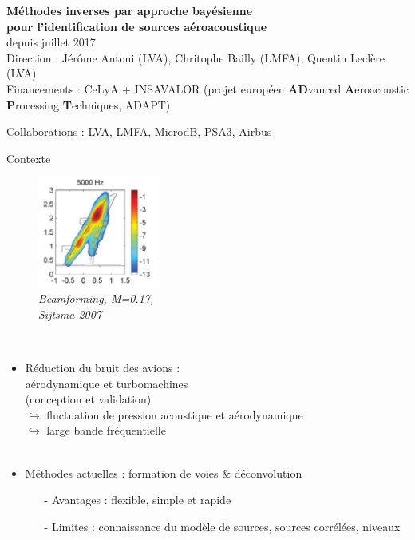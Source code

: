 \begin{frame}
	\centering
	\textbf{ Méthodes inverses par approche bayésienne \\pour l'identification de sources aéroacoustique}\\
	\footnotesize{depuis juillet 2017}\\[0.5cm]
	Direction : Jérôme Antoni (LVA), Chritophe Bailly (LMFA), Quentin Leclère (LVA)\\[0.5cm]
	Financements : CeLyA + INSAVALOR (projet européen \textbf{AD}vanced \textbf{A}eroacoustic \textbf{P}rocessing \textbf{T}echniques, ADAPT)

	Collaborations : LVA, LMFA, MicrodB, PSA3, Airbus
\end{frame}


\begin{frame}{Contexte}
		\begin{figure}
			\centering
			\vspace{-0.9cm}\includegraphics[width=4cm]{img/bf_sijtsma.png}\\
			\scriptsize{\itshape Beamforming, M=0.17,\\Sijtsma 2007}
			\vspace{-3cm}
		\end{figure}~
		\begin{itemize}
			\item Réduction du bruit des avions  : \\ aérodynamique et turbomachines\\   (conception et validation)\\
			 $\hookrightarrow$ fluctuation de pression acoustique et aérodynamique\\
			 $\hookrightarrow$ large bande fréquentielle\\~\\

				
			\item Méthodes actuelles : formation de voies \& déconvolution
				\begin{itemize}
					\item[-]  Avantages : flexible, simple et rapide
					\item[-]  Limites : connaissance du modèle de sources, sources corrélées, niveaux
				\end{itemize}
		\end{itemize}
	
\end{frame}


